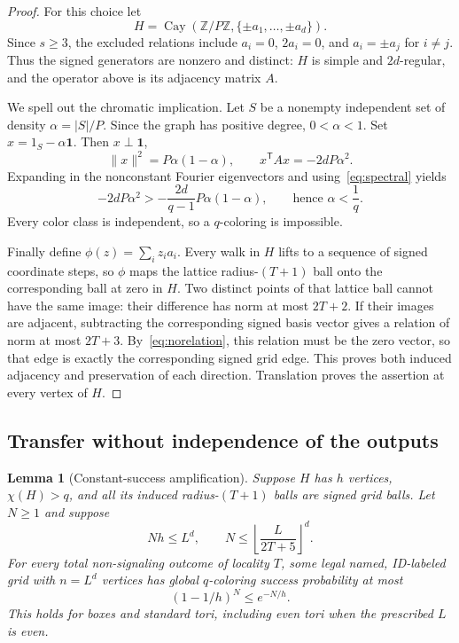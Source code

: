 \documentclass[11pt]{article}
\newtheorem{lemma}[theorem]{Lemma}
\theoremstyle{definition}\newtheorem{definition}[theorem]{Definition}
\theoremstyle{remark}\newtheorem{remark}[theorem]{Remark}
\newcommand{\Z}{\mathbb Z}
\newcommand{\norm}[1]{\lVert#1\rVert}
\begin{document}
\begin{proof}
For this choice let
\[
 H=\operatorname{Cay}(\Z/P\Z,\{\pm a_1,\ldots,\pm a_d\}).
\]
Since $s\ge3$, the excluded relations include $a_i=0$,
$2a_i=0$, and $a_i=\pm a_j$ for $i\ne j$. Thus the signed
generators are nonzero and distinct: $H$ is simple and $2d$-regular,
and the operator above is its adjacency matrix $A$.

We spell out the chromatic implication. Let $S$ be a nonempty
independent set of density $\alpha=|S|/P$. Since the graph has
positive degree, $0<\alpha<1$. Set $x=1_S-\alpha\mathbf1$.
Then $x\perp\mathbf1$,
\[
 \norm{x}^2=P\alpha(1-\alpha),\qquad
 x^{\mathsf T}Ax=-2dP\alpha^2.
\]
Expanding in the nonconstant Fourier eigenvectors and
using~\eqref{eq:spectral} yields
\[
 -2dP\alpha^2>
 -\frac{2d}{q-1}P\alpha(1-\alpha),
 \qquad\text{hence }\alpha<\frac1q.
\]
Every color class is independent, so a $q$-coloring is impossible.

Finally define $\phi(z)=\sum_i z_i a_i$. Every walk in $H$ lifts to
a sequence of signed coordinate steps, so $\phi$ maps the lattice
radius-$(T+1)$ ball onto the corresponding ball at zero in $H$.
Two distinct points of that lattice ball cannot have the same image:
their difference has norm at most $2T+2$. If their images are
adjacent, subtracting the corresponding signed basis vector gives
a relation of norm at most $2T+3$. By~\eqref{eq:norelation}, this
relation must be the zero vector, so that edge is exactly the
corresponding signed grid edge. This proves both induced adjacency
and preservation of each direction. Translation proves the assertion
at every vertex of $H$.
\end{proof}

\subsection{Transfer without independence of the outputs}

\begin{lemma}[Constant-success amplification]\label{lem:amplify}
Suppose $H$ has $h$ vertices, $\chi(H)>q$, and all its induced
radius-$(T+1)$ balls are signed grid balls. Let $N\ge1$ and suppose
\begin{equation}\label{eq:packing}
 Nh\le L^d,\qquad
 N\le\left\lfloor\frac{L}{2T+5}\right\rfloor^d.
\end{equation}
For every total non-signaling outcome of locality $T$, some legal
named, ID-labeled grid with $n=L^d$ vertices has global $q$-coloring
success probability at most
\[
                         (1-1/h)^N\le e^{-N/h}.
\]
This holds for boxes and standard tori, including even tori when
the prescribed $L$ is even.
\end{lemma}
\end{document}
